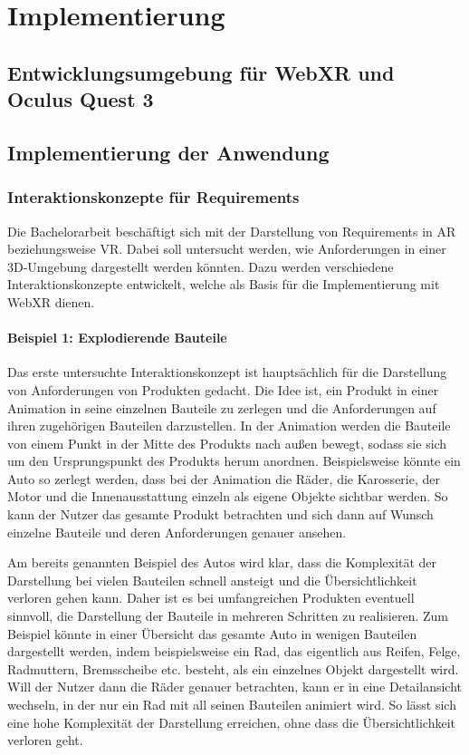\chapter{Implementierung}

\section{Entwicklungsumgebung für WebXR und Oculus Quest 3}

\section{Implementierung der Anwendung}

\subsection{Interaktionskonzepte für Requirements}

Die Bachelorarbeit beschäftigt sich mit der Darstellung von Requirements in AR beziehungsweise VR.
Dabei soll untersucht werden, wie Anforderungen in einer 3D-Umgebung dargestellt werden könnten.
Dazu werden verschiedene Interaktionskonzepte entwickelt, welche als Basis für die Implementierung mit WebXR dienen.


\subsubsection{Beispiel 1: Explodierende Bauteile}

Das erste untersuchte Interaktionskonzept ist hauptsächlich für die Darstellung von Anforderungen von Produkten gedacht.
Die Idee ist, ein Produkt in einer Animation in seine einzelnen Bauteile zu zerlegen und die Anforderungen auf ihren zugehörigen Bauteilen darzustellen.
In der Animation werden die Bauteile von einem Punkt in der Mitte des Produkts nach außen bewegt, sodass sie sich um den Ursprungspunkt des Produkts herum anordnen.
Beispielsweise könnte ein Auto so zerlegt werden, dass bei der Animation die Räder, die Karosserie, der Motor und die Innenausstattung einzeln als eigene Objekte sichtbar werden.
So kann der Nutzer das gesamte Produkt betrachten und sich dann auf Wunsch einzelne Bauteile und deren Anforderungen genauer ansehen.

Am bereits genannten Beispiel des Autos wird klar, dass die Komplexität der Darstellung bei vielen Bauteilen schnell ansteigt und die Übersichtlichkeit verloren gehen kann.
Daher ist es bei umfangreichen Produkten eventuell sinnvoll, die Darstellung der Bauteile in mehreren Schritten zu realisieren.
Zum Beispiel könnte in einer Übersicht das gesamte Auto in wenigen Bauteilen dargestellt werden, indem beispielsweise ein Rad, das eigentlich aus Reifen, Felge, Radmuttern, Bremsscheibe etc. besteht, als ein einzelnes Objekt dargestellt wird.
Will der Nutzer dann die Räder genauer betrachten, kann er in eine Detailansicht wechseln, in der nur ein Rad mit all seinen Bauteilen animiert wird.
So lässt sich eine hohe Komplexität der Darstellung erreichen, ohne dass die Übersichtlichkeit verloren geht.



